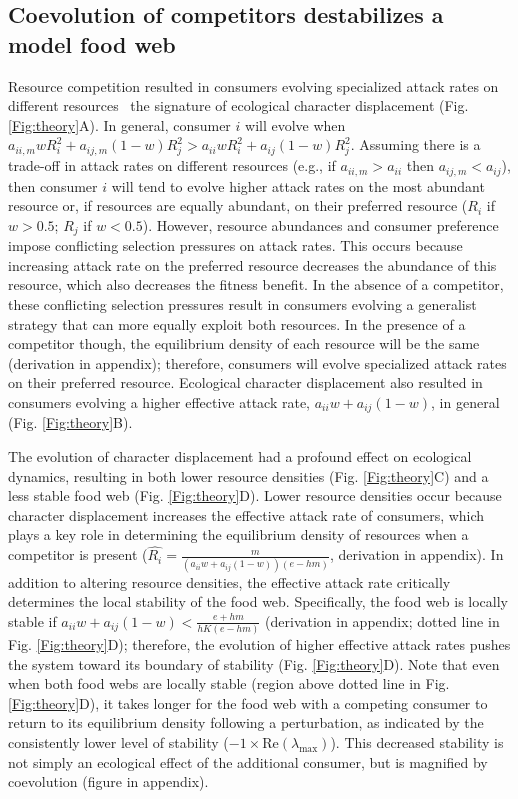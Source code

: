 \documentclass[11pt]{article}
\begin{document}
\subsection*{Coevolution of competitors destabilizes a model food web}
Resource competition resulted in consumers evolving specialized attack rates on different resources \textemdash \ the signature of ecological character displacement (Fig. \ref{Fig:theory}A). In general, consumer $i$ will evolve when $a_{ii,m}wR_i^2 + a_{ij,m}(1-w)R_j^2>a_{ii}wR_i^2+a_{ij}(1-w)R_j^2$. Assuming there is a trade-off in attack rates on different resources (e.g., if $a_{ii,m}>a_{ii}$ then $a_{ij,m}<a_{ij}$), then consumer $i$ will tend to evolve higher attack rates on the most abundant resource or, if resources are equally abundant, on their preferred resource ($R_i$ if $w>0.5$; $R_j$ if $w < 0.5$). However, resource abundances and consumer preference impose conflicting selection pressures on attack rates. This occurs because increasing attack rate on the preferred resource decreases the abundance of this resource, which also decreases the fitness benefit. In the absence of a competitor, these conflicting selection pressures result in consumers evolving a generalist strategy that can more equally exploit both resources. In the presence of a competitor though, the equilibrium density of each resource will be the same (derivation in appendix); therefore, consumers will evolve specialized attack rates on their preferred resource. Ecological character displacement also resulted in consumers evolving a higher effective attack rate, $a_{ii}w+a_{ij}(1-w)$, in general (Fig. \ref{Fig:theory}B). 

The evolution of character displacement had a profound effect on ecological dynamics, resulting in both lower resource densities (Fig. \ref{Fig:theory}C) and a less stable food web (Fig. \ref{Fig:theory}D). Lower resource densities occur because character displacement increases the effective attack rate of consumers, which plays a key role in determining the equilibrium density of resources when a competitor is present ($\widehat{R_i}=\frac{m}{(a_{ii}w+a_{ij}(1-w))(e-hm)}$, derivation in appendix). In addition to altering resource densities, the effective attack rate critically determines the local stability of the food web. Specifically, the food web is locally stable if $a_{ii}w + a_{ij}(1-w) < \frac{e+hm}{hK(e-hm)}$ (derivation in appendix; dotted line in Fig. \ref{Fig:theory}D); therefore, the evolution of higher effective attack rates pushes the system toward its boundary of stability (Fig. \ref{Fig:theory}D). Note that even when both food webs are locally stable (region above dotted line in Fig. \ref{Fig:theory}D), it takes longer for the food web with a competing consumer to return to its equilibrium density following a perturbation, as indicated by the consistently lower level of stability ($-1\times \text{Re}(\lambda_\text{max})$). This decreased stability is not simply an ecological effect of the additional consumer, but is magnified by coevolution (figure in appendix). 
\end{document}
